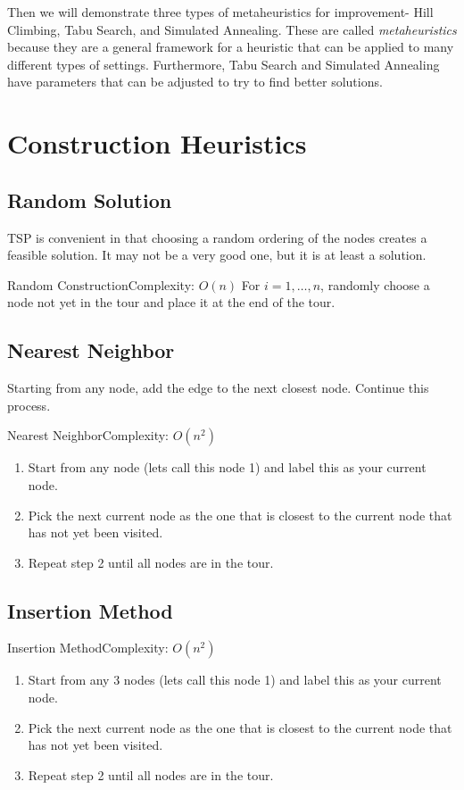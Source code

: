 Then we will demonstrate three types of metaheuristics for improvement- Hill Climbing, Tabu Search, and Simulated Annealing.  These are called \emph{metaheuristics} because they are a general framework for a heuristic that can be applied to many different types of settings.  Furthermore, Tabu Search and Simulated Annealing have parameters that can be adjusted to try to find better solutions.  

\section{Construction Heuristics}
\subsection{Random Solution}
TSP is convenient in that choosing a random ordering of the nodes creates a feasible solution.  It may not be a very good one, but it is at least a solution.

\begin{general}{Random Construction}{Complexity: $O(n)$}
\label{heuristic:random}
For $i=1, \dots, n$, randomly choose a node not yet in the tour and place it at the end of the tour.
\end{general}

\subsection{Nearest Neighbor}
Starting from any node, add the edge to the next closest node.  Continue this process.
\begin{general}{Nearest Neighbor}{Complexity: $O(n^2)$}
\label{heuristic:nearestNeighbor}
\begin{enumerate}
\item Start from any node (lets call this node 1) and label this as your current node.
\item Pick the next current node as the one that is closest to the current node that has not yet been visited.
\item Repeat step 2 until all nodes are in the tour.
\end{enumerate}
\end{general}

\subsection{Insertion Method }
\begin{general}{Insertion Method}{Complexity: $O(n^2)$}
\label{heuristic:insertion}
\begin{enumerate}
\item Start from any 3 nodes (lets call this node 1) and label this as your current node.
\item Pick the next current node as the one that is closest to the current node that has not yet been visited.
\item Repeat step 2 until all nodes are in the tour.
\end{enumerate}
\end{general}


